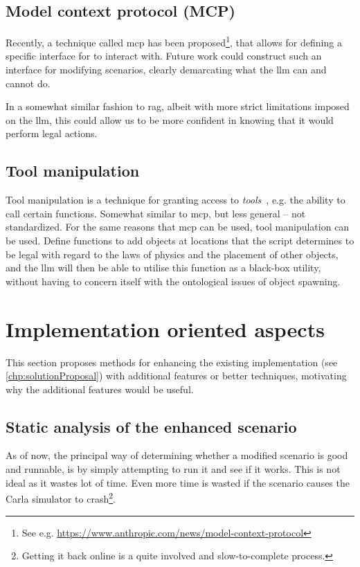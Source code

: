 \subsection{Model context protocol (MCP)}

Recently, a technique called \acrfull{mcp} has been proposed\footnote{See e.g.
    \url{https://www.anthropic.com/news/model-context-protocol}}, that allows for defining a specific
interface for  to interact with. Future work could construct such an interface for
modifying scenarios, clearly demarcating what the \acrshort{llm} can and cannot do.

In a somewhat similar fashion to \acrshort{rag}, albeit with more strict limitations imposed on the
\acrshort{llm}, this could allow us to be more confident in knowing that it would perform legal actions.

\subsection{Tool manipulation}

Tool manipulation is a technique for granting  access to
\emph{tools}~\cite[62]{llmSurvey}, e.g. the ability to call certain functions. Somewhat similar to
\acrshort{mcp}, but less general -- not standardized. For the same reasons that \acrshort{mcp} can
be used, tool manipulation can be used. Define functions to add objects at locations that the script
determines to be legal with regard to the laws of physics and the placement of other objects, and
the \acrshort{llm} will then be able to utilise this function as a black-box utility, without
having to concern itself with the ontological issues of object spawning.

\section{Implementation oriented aspects}

This section proposes methods for enhancing the existing implementation (see
\cref{chp:solutionProposal}) with additional features or better techniques, motivating why the
additional features would be useful.

\subsection{Static analysis of the enhanced scenario}

As of now, the principal way of determining whether a modified scenario is good and runnable, is by
simply attempting to run it and see if it works. This is not ideal as it wastes lot of time. Even
more time is wasted if the scenario causes the Carla simulator to crash\footnote{Getting it back
    online is a quite involved and slow-to-complete process.}.


